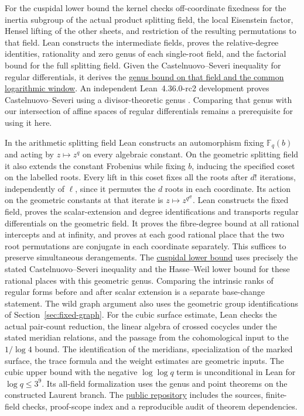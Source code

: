 \documentclass[preprint,12pt,numbers]{elsarticle}
\begin{document}
For the cuspidal lower bound the kernel checks off-coordinate
fixedness for the inertia subgroup of the actual product splitting
field, the local Eisenstein factor, Hensel lifting of the other
sheets, and restriction of the resulting permutations to that field.
Lean constructs the intermediate fields, proves the relative-degree
identities, rationality and zero genus of each single-root field,
and the factorial bound for the full splitting field. Given the
Castelnuovo--Severi inequality for regular differentials, it derives
the \href{https://github.com/Heinz1729/monomial-blocking-curves/blob/main/lean/CuspidalCompositumGenus.lean}{genus bound on that field and the common logarithmic window}.
An independent Lean~4.36.0-rc2 development proves Castelnuovo--Severi
using a divisor-theoretic genus \cite{TauCeti}. Comparing that genus
with our intersection of affine spaces of regular differentials
remains a prerequisite for using it here.

In the arithmetic splitting field Lean constructs an automorphism
fixing $\mathbb F_q(b)$ and acting by $z\mapsto z^q$ on every
algebraic constant. On the geometric splitting field it also
extends the constant Frobenius while fixing $b$, inducing the
specified coset on the labelled roots. Every lift in this coset fixes
all the roots after $d!$ iterations, independently of $\ell$, since it
permutes the $d$ roots in each coordinate. Its action on the geometric
constants at that iterate is $z\mapsto z^{q^{d!}}$. Lean constructs the fixed field, proves
the scalar-extension and degree identifications and transports regular
differentials on the geometric field. It proves the fibre-degree
bound at all rational intercepts and at infinity, and proves at each good rational place that the two root
permutations are conjugate in each coordinate separately. This suffices
to preserve simultaneous derangements. The
\href{https://github.com/Heinz1729/monomial-blocking-curves/blob/main/lean/CuspidalDescendedLower.lean}{cuspidal lower bound}
uses precisely the stated Castelnuovo--Severi inequality and the
Hasse--Weil lower bound for these rational places with this geometric
genus. Comparing the intrinsic ranks of regular forms before and after
scalar extension is a separate base-change statement.
The wild graph argument also uses the geometric group
identifications of Section~\ref{sec:fixed-graph}.
For the cubic surface estimate, Lean checks the actual pair-count
reduction, the linear algebra of crossed cocycles under the stated
meridian relations, and the passage from the cohomological input to
the $1/\log4$ bound. The identification of the meridians, specialization
of the marked surface, the trace formula and the weight estimates are
geometric inputs. The cubic upper bound with the negative $\log\log q$
term is unconditional in Lean for $\log q\le3^9$. Its all-field
formalization uses the genus and point theorems on the constructed
Laurent branch. The \href{https://github.com/Heinz1729/monomial-blocking-curves}{public
repository} includes the sources, finite-field checks, proof-scope
index and a reproducible audit of theorem dependencies.
\end{document}
